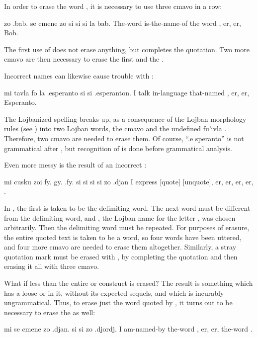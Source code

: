 In order to erase the word , it is necessary to use three
     cmavo in a row:
\begin{example}
zo .bab. se cmene zo si si si la bab.\n
The-word  is-the-name-of the word , er, er, Bob.
\end{example}

The first use of  does not erase anything, but
    completes the  quotation. Two more  cmavo are then
    necessary to erase the first  and the .

Incorrect names can likewise cause trouble with :
\begin{example}
mi tavla fo la .esperanto\n
\T	si si .esperanton.\n
I talk in-language that-named  ,\n
\T	er, er, Esperanto.
\end{example}

The Lojbanized spelling  breaks up, as a
    consequence of the Lojban morphology rules (see ) into two Lojban words, the
    cmavo  and the undefined fu'ivla . Therefore,
    two  cmavo are needed to erase them. Of course, ``.e
    speranto'' is not grammatical after , but recognition of
     is done before grammatical analysis.

Even more messy is the result of an incorrect :
\begin{example}
mi cusku zoi fy. gy. .fy.\n
\T	si si si si zo .djan\n
I express  [quote]  [unquote],\n
\T	er, er, er, er, .
\end{example}

In , the first  is
    taken to be the delimiting word. The next word must be
    different from the delimiting word, and , the Lojban
    name for the letter , was chosen arbitrarily. Then the
    delimiting word must be repeated. For purposes of 
    erasure, the entire quoted text is taken to be a word, so four
    words have been uttered, and four more  cmavo are needed
    to erase them altogether. Similarly, a stray  quotation
    mark must be erased with , by completing
    the quotation and then erasing it all with three 
    cmavo.

What if less than the entire  or  construct is
    erased? The result is something which has a loose  or
     in it, without its expected sequels, and which is
    incurably ungrammatical. Thus, to erase just the word quoted by
    , it turns out to be necessary to erase the  as
    well:
\begin{example}
mi se cmene zo .djan.\n
\T	si si zo .djordj.\n
I am-named-by the-word ,\n
\T	er, er, the-word .
\end{example}

